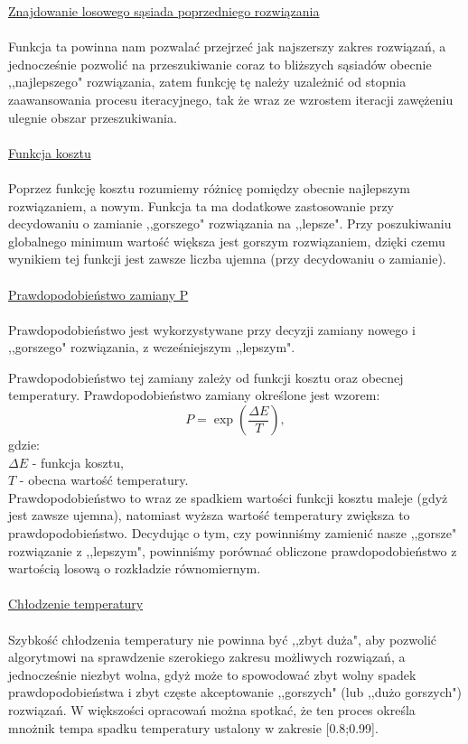 \documentclass[twoside]{projektInzynierskiMS1}
\newcommand{\newLine}{~\\}
\newcommand{\si}{ś}
\begin{document}
\noindent \underline{Znajdowanie losowego sąsiada poprzedniego rozwiązania} \\ \newLine
\indent Funkcja ta powinna nam pozwalać przejrzeć jak najszerszy zakres rozwiązań, a jednocze\si nie pozwolić na przeszukiwanie coraz to bliższych sąsiadów obecnie ,,najlepszego" rozwiązania, zatem funkcję tę należy uzależnić od stopnia zaawansowania procesu iteracyjnego, tak że wraz ze wzrostem iteracji zawężeniu ulegnie obszar przeszukiwania.\\ \newLine

\noindent \underline{Funkcja kosztu} \\ \newLine
\indent Poprzez funkcję kosztu rozumiemy różnicę pomiędzy obecnie najlepszym rozwiązaniem, a nowym. Funkcja ta ma dodatkowe zastosowanie przy decydowaniu o zamianie ,,gorszego" rozwiązania na ,,lepsze". Przy poszukiwaniu globalnego minimum warto\si ć większa jest gorszym rozwiązaniem, dzięki czemu wynikiem tej funkcji jest zawsze liczba ujemna (przy decydowaniu o zamianie). \\ \newLine


\noindent \underline{Prawdopodobieństwo zamiany P} \\ \newLine
\indent Prawdopodobieństwo jest wykorzystywane przy decyzji zamiany nowego i ,,gorszego" rozwiązania, z wcze\si niejszym ,,lepszym". 

Prawdopodobieństwo tej zamiany zależy od funkcji kosztu oraz obecnej temperatury. Prawdopodobieństwo zamiany okre\si lone jest wzorem:
$$ P = \exp\left(\frac{\Delta E}{T}\right),  $$
gdzie:\\
$ \Delta E$  - funkcja kosztu, \\
$T$ - obecna warto\si ć temperatury.\\

Prawdopodobieństwo to wraz ze spadkiem warto\si ci funkcji kosztu maleje (gdyż jest zawsze ujemna), natomiast wyższa warto\si ć temperatury zwiększa to prawdopodobieństwo. Decydując o tym, czy powinniśmy zamienić nasze ,,gorsze" rozwiązanie z ,,lepszym", powinniśmy porównać obliczone prawdopodobieństwo z wartością losową o rozkładzie równomiernym.\\ \newLine


\noindent \underline{Chłodzenie temperatury} \\ \newLine
\indent Szybkość chłodzenia temperatury nie powinna być ,,zbyt duża", aby pozwolić algorytmowi na sprawdzenie szerokiego zakresu możliwych rozwiązań, a jednocześnie niezbyt wolna, gdyż może to spowodować zbyt wolny spadek prawdopodobieństwa i zbyt częste akceptowanie ,,gorszych" (lub ,,dużo gorszych") rozwiązań. W większości opracowań można spotkać, że ten proces okre\si la mnożnik tempa spadku temperatury ustalony w zakresie [0.8;0.99].\\ \newLine
		
\end{document}
